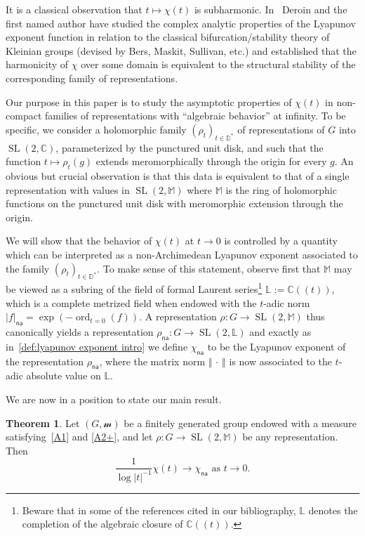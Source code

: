 \documentclass[10pt]{amsart}
\theoremstyle{definition}\newtheorem{defi}[theo]{Definition}\newtheorem{rema}[theo]{Remark}\newtheorem{exam}[theo]{Example}\newtheorem{exem}[theo]{Example}\newtheorem{nota}[theo]{Notation}
\DeclareMathOperator{\ord}{ord}
\DeclareMathOperator{\SL}{SL}
\newcommand{\cc}{\mathbb{C}}
\newcommand{\dD}{\mathbb{D}}
\newcommand{\sm}{\mathcal{m}}
\newcommand{\cdt}{\cc(\!(t)\!)}
\newcommand{\mm}{\mathbb{M}}
\newcommand{\cv}{\rightarrow}
\newcommand{\norm}[1]{\left\Vert#1\right\Vert}
\newcommand{\abs}[1]{\left\vert#1\right\vert}
\newcommand{\Laurent}{\mathbb{L}}
\newcommand{\unsur}[1]{\frac{1}{#1}}
\newcommand{\na}{\mathsf{na}}
\newcommand{\SLC}{\SL(2,\mathbb C)}
\newcommand{\inv}{^{-1}}
\newtheorem{mthm}{Theorem}
\begin{document}
It is a classical observation that $t\mapsto \chi(t)$ is subharmonic. In~\cite{kleinbif, bers1} Deroin and the first named author have studied the complex analytic properties of the Lyapunov exponent function in relation to the classical bifurcation/stability theory of Kleinian groups (devised by Bers, Maskit, Sullivan, etc.) and established that the harmonicity of $\chi$ over some domain is equivalent to the structural stability of the corresponding family of representations.


Our purpose in this paper is to study the asymptotic properties of $\chi(t)$ in non-compact families of representations with ``algebraic behavior'' at infinity. To be specific, we consider a holomorphic family $(\rho_t)_{t\in \dD^*}$ of representations of $G$ into $\SLC$, parameterized by the punctured unit disk, and such that the function $t\mapsto \rho_t(g)$ extends meromorphically through the origin for every $g$. An obvious but crucial observation is that this data is equivalent to that of a single representation with values in $\SL(2, \mm)$ where $\mm$ is the ring of holomorphic functions on the punctured unit disk with meromorphic extension through the origin.

We will show that the behavior of $\chi(t)$ at $t\to 0$ is controlled by a quantity which can be interpreted as a non-Archimedean Lyapunov exponent associated to the family $(\rho_t)_{t\in \dD^*}$. To make sense of this statement, observe first that $\mm$ may be viewed as a subring of the field of formal Laurent series\footnote{Beware that in some of the references cited in our bibliography, $\Laurent$ denotes the completion of the algebraic closure of $\cdt$.} $\Laurent:=\cdt$, which is a complete metrized field when endowed with the $t$-adic norm $\abs{f}_\na = \exp(-\ord_{t=0}(f))$. A representation $\rho : G \to \SL(2,\mm)$ thus canonically yields a representation $\rho_\na : G \to \SL(2,\Laurent)$ and exactly as in~\eqref{def:lyapunov exponent intro} we define $\chi_\na$ to be the Lyapunov exponent of the representation $\rho_\na$, where the matrix norm $\norm{\,\cdot\,}$ is now associated to the $t$-adic absolute value on $\Laurent$.


We are now in a position to state our main result.


\begin{mthm}\label{Thm:lyapunov na}
Let $(G, \sm)$ be a finitely generated group endowed with a measure satisfying~\eqref{A1} and \eqref{A2+}, and let $\rho: G\to \SL(2, \mm)$ be any representation. Then
\begin{equation}
\label{eq:lyapunov na}
\unsur{{\log\abs{t}\inv}}\chi(t) \longrightarrow \chi_\na \text{ as } t\cv 0.
\end{equation}
\end{mthm}
\end{document}
